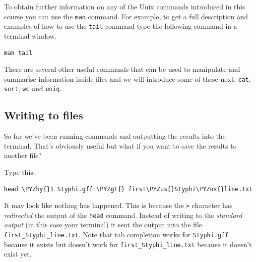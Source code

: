 \documentclass[11pt]{article}
\makeatletter
\def\PYZus{\char`\_}
\def\PYZgt{\char`\>}
\def\PYZhy{\char`\-}
\newcommand{\boxspacing}{\kern\kvtcb@left@rule\kern\kvtcb@boxsep}
\newcommand{\prompt}[4]{
       \ttfamily\llap{{\color{#2}\LARGE\faKeyboardO\hspace{3pt}#4}}\vspace{-\baselineskip}
    }
\makeatother
\begin{document}
To obtain further information on any of the Unix commands introduced in
this course you can use the \texttt{man} command. For example, to get a
full description and examples of how to use the \texttt{tail} command
type the following command in a terminal window.

    \begin{tcolorbox}[breakable, size=fbox, boxrule=1pt, pad at break*=1mm,colback=cellbackground, colframe=cellborder]
\prompt{In}{incolor}{ }{\boxspacing}
\begin{Verbatim}[commandchars=\\\{\}]
man tail
\end{Verbatim}
\end{tcolorbox}

    There are several other useful commands that can be used to manipulate
and summarise information inside files and we will introduce some of
these next, \texttt{cat}, \texttt{sort}, \texttt{wc} and \texttt{uniq}.

    \hypertarget{writing-to-files}{%
\subsection{Writing to files}\label{writing-to-files}}

So far we've been running commands and outputting the results into the
terminal. That's obviously useful but what if you want to save the
results to another file?

Type this:

    \begin{tcolorbox}[breakable, size=fbox, boxrule=1pt, pad at break*=1mm,colback=cellbackground, colframe=cellborder]
\prompt{In}{incolor}{ }{\boxspacing}
\begin{Verbatim}[commandchars=\\\{\}]
head \PYZhy{}1 Styphi.gff \PYZgt{} first\PYZus{}Styphi\PYZus{}line.txt
\end{Verbatim}
\end{tcolorbox}

    It may look like nothing has happened. This is because the
\texttt{\textgreater{}} character has \textit{redirected} the output of
the \texttt{head} command. Instead of writing to the \textit{standard
output} (in this case your terminal) it sent the output into the file
\texttt{first\_Styphi\_line.txt}. Note that tab completion works for
\texttt{Styphi.gff} because it exists but doesn't work for
\texttt{first\_Styphi\_line.txt} because it doesn't exist yet.
\end{document}
